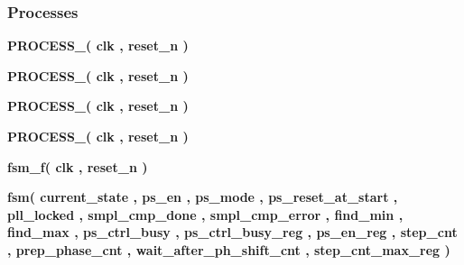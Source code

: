 \subsubsection*{Processes}
 \begin{DoxyCompactItemize}
\item 
{\bf P\+R\+O\+C\+E\+S\+S\+\_}{\bfseries  ( {\bfseries {\bfseries {\bf clk}} \textcolor{vhdlchar}{ }} , {\bfseries {\bfseries {\bf reset\+\_\+n}} \textcolor{vhdlchar}{ }} )}
\item 
{\bf P\+R\+O\+C\+E\+S\+S\+\_}{\bfseries  ( {\bfseries {\bfseries {\bf clk}} \textcolor{vhdlchar}{ }} , {\bfseries {\bfseries {\bf reset\+\_\+n}} \textcolor{vhdlchar}{ }} )}
\item 
{\bf P\+R\+O\+C\+E\+S\+S\+\_}{\bfseries  ( {\bfseries {\bfseries {\bf clk}} \textcolor{vhdlchar}{ }} , {\bfseries {\bfseries {\bf reset\+\_\+n}} \textcolor{vhdlchar}{ }} )}
\item 
{\bf P\+R\+O\+C\+E\+S\+S\+\_}{\bfseries  ( {\bfseries {\bfseries {\bf clk}} \textcolor{vhdlchar}{ }} , {\bfseries {\bfseries {\bf reset\+\_\+n}} \textcolor{vhdlchar}{ }} )}
\item 
{\bf fsm\+\_\+f}{\bfseries  ( {\bfseries {\bfseries {\bf clk}} \textcolor{vhdlchar}{ }} , {\bfseries {\bfseries {\bf reset\+\_\+n}} \textcolor{vhdlchar}{ }} )}
\item 
{\bf fsm}{\bfseries  ( {\bfseries {\bfseries {\bf current\+\_\+state}} \textcolor{vhdlchar}{ }} , {\bfseries {\bfseries {\bf ps\+\_\+en}} \textcolor{vhdlchar}{ }} , {\bfseries {\bfseries {\bf ps\+\_\+mode}} \textcolor{vhdlchar}{ }} , {\bfseries {\bfseries {\bf ps\+\_\+reset\+\_\+at\+\_\+start}} \textcolor{vhdlchar}{ }} , {\bfseries {\bfseries {\bf pll\+\_\+locked}} \textcolor{vhdlchar}{ }} , {\bfseries {\bfseries {\bf smpl\+\_\+cmp\+\_\+done}} \textcolor{vhdlchar}{ }} , {\bfseries {\bfseries {\bf smpl\+\_\+cmp\+\_\+error}} \textcolor{vhdlchar}{ }} , {\bfseries {\bfseries {\bf find\+\_\+min}} \textcolor{vhdlchar}{ }} , {\bfseries {\bfseries {\bf find\+\_\+max}} \textcolor{vhdlchar}{ }} , {\bfseries {\bfseries {\bf ps\+\_\+ctrl\+\_\+busy}} \textcolor{vhdlchar}{ }} , {\bfseries {\bfseries {\bf ps\+\_\+ctrl\+\_\+busy\+\_\+reg}} \textcolor{vhdlchar}{ }} , {\bfseries {\bfseries {\bf ps\+\_\+en\+\_\+reg}} \textcolor{vhdlchar}{ }} , {\bfseries {\bfseries {\bf step\+\_\+cnt}} \textcolor{vhdlchar}{ }} , {\bfseries {\bfseries {\bf prep\+\_\+phase\+\_\+cnt}} \textcolor{vhdlchar}{ }} , {\bfseries {\bfseries {\bf wait\+\_\+after\+\_\+ph\+\_\+shift\+\_\+cnt}} \textcolor{vhdlchar}{ }} , {\bfseries {\bfseries {\bf step\+\_\+cnt\+\_\+max\+\_\+reg}} \textcolor{vhdlchar}{ }} )}

\end{DoxyCompactItemize}
